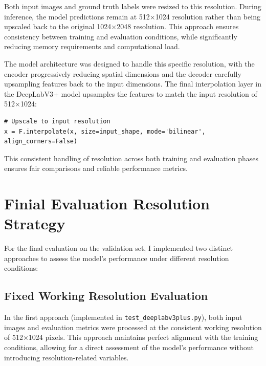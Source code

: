 \documentclass[]{article}
\begin{document}
Both input images and ground truth labels were resized to this resolution. During inference, the model predictions remain at 512×1024 resolution rather than being upscaled back to the original 1024×2048 resolution. This approach ensures consistency between training and evaluation conditions, while significantly reducing memory requirements and computational load.

The model architecture was designed to handle this specific resolution, with the encoder progressively reducing spatial dimensions and the decoder carefully upsampling features back to the input dimensions. The final interpolation layer in the DeepLabV3+ model upsamples the features to match the input resolution of 512×1024:

\begin{verbatim}
# Upscale to input resolution
x = F.interpolate(x, size=input_shape, mode='bilinear', align_corners=False)
\end{verbatim}

This consistent handling of resolution across both training and evaluation phases ensures fair comparisons and reliable performance metrics.

\section{Finial Evaluation Resolution Strategy}\label{sec:Evaluation}
For the final evaluation on the validation set, I implemented two distinct approaches to assess the model's performance under different resolution conditions:

\subsection{Fixed Working Resolution Evaluation}
In the first approach (implemented in \texttt{test\_deeplabv3plus.py}), both input images and evaluation metrics were processed at the consistent working resolution of 512×1024 pixels. This approach maintains perfect alignment with the training conditions, allowing for a direct assessment of the model's performance without introducing resolution-related variables.
\end{document}
